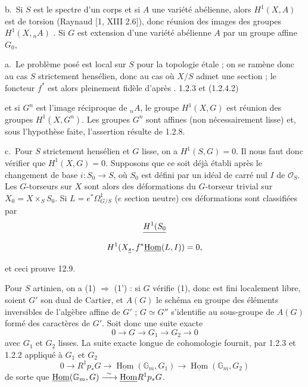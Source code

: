 \documentclass[11pt,a4paper]{article}
\begin{document}
b.\ Si $S$ est le spectre d'un corps  et si $A$
 une variété abélienne, alors $H^1(X, A)$ est de torsion (Raynaud
[1, XIII 2.6]), donc réunion des images des groupes $H^1(X, {}_nA)$
. Si $G$ est extension d'une variété
abélienne $A$ par un groupe \struck{\ill{}} affine $G_0$, 

a.\ Le problème posé est local sur $S$ pour la topologie étale ; on se ramène
donc au cas $S$ strictement hensélien, donc au cas où  $X/S$ admet une section ; le foncteur $f^{*}$ est alors
pleinement fidèle d'après . 1.2.3 et (1.2.4.2)


et si $G^n$ est l'image réciproque de ${}_nA$, le groupe $H^1(X, G)$ est
réunion des groupes $H^1(X, G^n)$. Les groupes $G^n$ sont affines (non
nécessairement lisse) et, sous l'hypothèse faite, l'assertion résulte de
1.2.8. 

c.\ Pour $S$ strictement hensélien et $G$ lisse, on a $H^1(S, G) = 0$. Il nous
faut donc vérifier que $H^1(X, G) = 0$. Supposons que ce soit déjà établi
après le changement de base $i : S_0 \to S$, où $S_0$ est défini par un idéal
de carré nul  $I$  de $\mathcal{O}_S$. Les
$G$-torseurs sur $X$ sont alors des déformations du $G$-torseur trivial sur
$X_0 = X \times_S S_0$. Si $L = e^{*} \Omega^1_{G/S}$ ($e$ section neutre)
ces déformations sont classifiées par
\[
\struck{H^1(S_0}
\]
\[
H^1(X_{\struck{s}}, f^{*} \underline{\operatorname{Hom}}(L, I)) = 0,
\]
et ceci prouve 12.9.


Pour $S$ artinien, on a (1) $\Rightarrow$ (1') : si $G$ vérifie (1), donc est
fini localement libre, soient $G'$ son dual de Cartier, et $A(G)$ le schéma
en groupe  des éléments inversibles de l'algèbre affine de $G'$ ;
$G \simeq G''$ s'identifie au sous-groupe de $A(G)$ formé des caractères de
$G'$. Soit donc une suite exacte
\[
0 \to G \to G_1 \to G_2 \to 0
\]
avec $G_1$ et $G_2$ lisses. La suite exacte longue de cohomologie fournit, par
1.2.3 et 1.2.2 appliqué à $G_1$ et $G_2$
\[
0 \to R^1 p_{*} G \to \underline{\operatorname{Hom}}(\mathbb{G}_m, G_1) \to
\underline{\operatorname{Hom}}(\mathbb{G}_m, G_2)
\]
de sorte que $\underline{\operatorname{Hom}}(\mathbb{G}_m, G) \xrightarrow{\ \sim\ }
\struck{\operatorname{Hom}} R^1 p_{*} G$.
\end{document}

